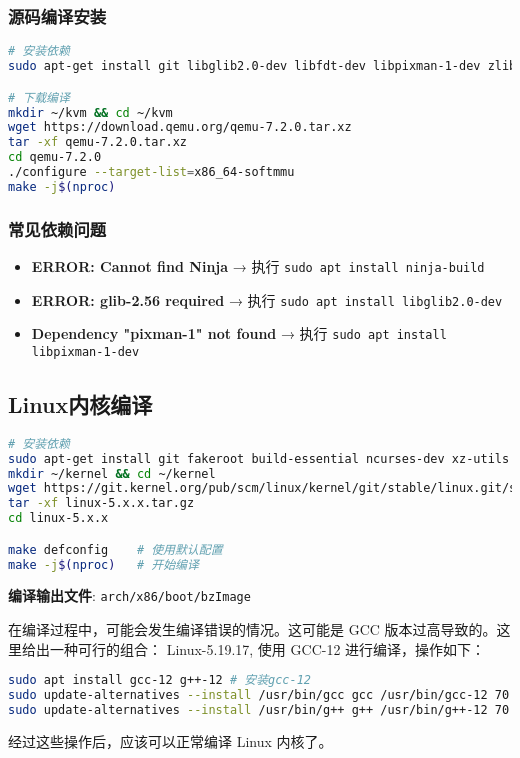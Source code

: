 \subsubsection{源码编译安装}
\begin{lstlisting}[language=bash]
# 安装依赖
sudo apt-get install git libglib2.0-dev libfdt-dev libpixman-1-dev zlib1g-dev ninja-build

# 下载编译
mkdir ~/kvm && cd ~/kvm
wget https://download.qemu.org/qemu-7.2.0.tar.xz
tar -xf qemu-7.2.0.tar.xz
cd qemu-7.2.0
./configure --target-list=x86_64-softmmu
make -j$(nproc)
\end{lstlisting}

\subsubsection{常见依赖问题}
\begin{itemize}
    \item \textbf{ERROR: Cannot find Ninja} → 执行 \texttt{sudo apt install ninja-build}
    \item \textbf{ERROR: glib-2.56 required} → 执行 \texttt{sudo apt install libglib2.0-dev}
    \item \textbf{Dependency "pixman-1" not found} → 执行 \texttt{sudo apt install libpixman-1-dev}
\end{itemize}

\subsection{Linux内核编译}
\begin{lstlisting}[language=bash]
# 安装依赖
sudo apt-get install git fakeroot build-essential ncurses-dev xz-utils libssl-dev bc flex libelf-dev bison 
mkdir ~/kernel && cd ~/kernel
wget https://git.kernel.org/pub/scm/linux/kernel/git/stable/linux.git/snapshot/linux-5.x.x.tar.gz
tar -xf linux-5.x.x.tar.gz
cd linux-5.x.x

make defconfig    # 使用默认配置
make -j$(nproc)   # 开始编译
\end{lstlisting}

\textbf{编译输出文件}: \texttt{arch/x86/boot/bzImage}

在编译过程中，可能会发生编译错误的情况。这可能是 GCC 版本过高导致的。这里给出一种可行的组合： Linux-5.19.17, 使用 GCC-12 进行编译，操作如下：

\begin{lstlisting}[language=bash]
sudo apt install gcc-12 g++-12 # 安装gcc-12
sudo update-alternatives --install /usr/bin/gcc gcc /usr/bin/gcc-12 70
sudo update-alternatives --install /usr/bin/g++ g++ /usr/bin/g++-12 70 # 切换 gcc 默认版本
\end{lstlisting}
经过这些操作后，应该可以正常编译 Linux 内核了。

